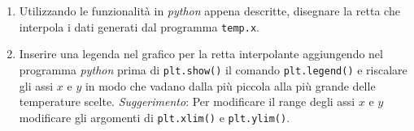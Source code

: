 \documentclass[11pt]{article}
\begin{document}
\begin{enumerate}
  \item Utilizzando le funzionalit\`a in {\it python\/} appena descritte, disegnare la retta che interpola i dati generati dal programma \texttt{temp.x}.
\item 
Inserire una legenda nel grafico per la retta interpolante aggiungendo nel programma \textit{python} prima di 
\lstinline[language=python]!plt.show()! 
il comando \lstinline[language=python]!plt.legend()! e riscalare gli assi $x$ e $y$ in modo che vadano dalla più piccola alla più grande delle temperature scelte. {\em Suggerimento}: Per modificare il range degli assi $x$ e $y$ modificare gli argomenti di \texttt{plt.xlim()} e \texttt{plt.ylim()}.
\end{enumerate}  
\end{document}
